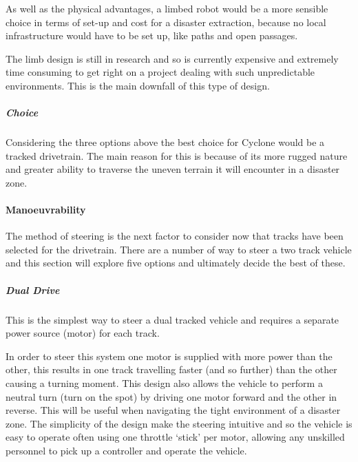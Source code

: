 As well as the physical advantages, a limbed robot would be a more sensible choice in terms of set-up and cost for a disaster extraction, because no local infrastructure would have to be set up, like paths and open passages.\par

The limb design is still in research and so is currently expensive and extremely time consuming to get right on a project dealing with such unpredictable environments. This is the main downfall of this type of design.\par

\subparagraph*{Choice}

Considering the three options above the best choice for Cyclone would be a tracked drivetrain. The main reason for this is because of its more rugged nature and greater ability to traverse the uneven terrain it will encounter in a disaster zone.\par

\paragraph*{Manoeuvrability}

The method of steering is the next factor to consider now that tracks have been selected for the drivetrain. There are a number of way to steer a two track vehicle and this section will explore five options and ultimately decide the best of these.\par

\subparagraph*{Dual Drive}

This is the simplest way to steer a dual tracked vehicle and requires a separate power source (motor) for each track.\par

In order to steer this system one motor is supplied with more power than the other, this results in one track travelling faster (and so further) than the other causing a turning moment. This design also allows the vehicle to perform a neutral turn (turn on the spot) by driving one motor forward and the other in reverse. This will be useful when navigating the tight environment of a disaster zone. The simplicity of the design make the steering intuitive and so the vehicle is easy to operate often using one throttle ‘stick’ per motor, allowing any unskilled personnel to pick up a controller and operate the vehicle.\par

